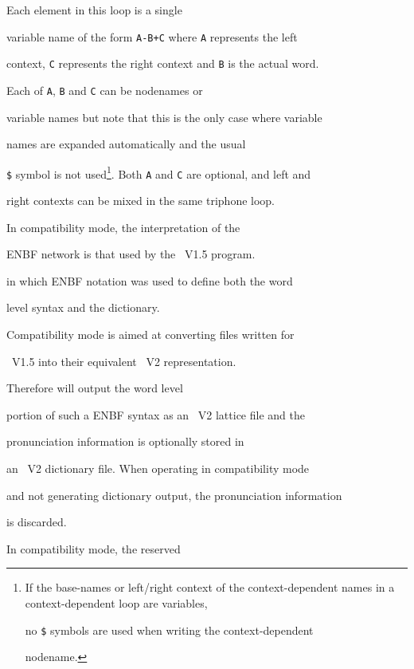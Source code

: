 Each element in this loop is a single


variable name of the form \texttt{A-B+C} where \texttt{A} represents the left


context, \texttt{C} represents the right context and \texttt{B} is the actual word.


Each of \texttt{A}, \texttt{B} and \texttt{C} can be nodenames or


variable names but note that this is the only case where variable


names are expanded automatically and the usual


\texttt{\$} symbol is not used\footnote{If the base-names or left/right context of the context-dependent names in a context-dependent loop are variables,  


no \texttt{\$} symbols are used when writing the context-dependent


nodename.}.  Both \texttt{A} and \texttt{C} are optional, and left and


right contexts can be mixed in the same triphone loop.







In  compatibility mode, the interpretation of the 


ENBF network is that used by the \HTK\ V1.5  program.


in which  ENBF notation was used to define both the word 


level syntax and the dictionary.


Compatibility mode is aimed at converting files written for


\HTK\ V1.5 into their equivalent \HTK\ V2 representation.


Therefore  will output the word level


portion of such a ENBF syntax as an \HTK\ V2 lattice file and the


pronunciation information is optionally stored in


an \HTK\ V2 dictionary file. When operating in compatibility mode


and not generating dictionary output, the pronunciation information


is discarded.





In compatibility mode, the reserved


